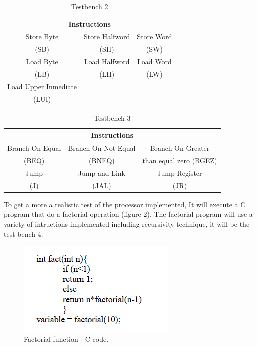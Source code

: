 \documentclass[conference]{IEEEtran}
\begin{document}
\FloatBarrier
\begin{table}[t]
	\caption{Testbench 2} %
	\begin{center}
		\begin{tabular}{|c|c|c|}
			\hline
			\multicolumn{3}{|c|}{\textbf{Instructions}} \\
			\hline
			Store Byte&Store Halfword&Store Word\\
			(SB)&(SH)&(SW)  \\
			\hline
			Load Byte&Load Halfword&Load Word\\
			(LB)&(LH)&(LW) \\
			\hline
			Load Upper Inmediate&&\\
			(LUI)&& \\
			\hline
		\end{tabular}
		\label{tab_test2}
	\end{center}
\end{table}
\FloatBarrier

\FloatBarrier
\begin{table}[htbp]
	\caption{Testbench 3} %
	\begin{center}
		\begin{tabular}{|c|c|c|}
			\hline
			\multicolumn{3}{|c|}{\textbf{Instructions}} \\
			\hline
			Branch On Equal&Branch On Not Equal&Branch On Greater \\
			(BEQ)&(BNEQ)&than equal zero (BGEZ)  \\
			\hline
			Jump&Jump and Link&Jump Register\\
			(J)&(JAL)&(JR) \\
			\hline
		\end{tabular}
		\label{tab_test3}
	\end{center}
\end{table}
\FloatBarrier

To get a more a realistic test of the processor implemented, It will execute a C program that do a factorial operation (figure 2). The factorial program will use a variety of  intructions implemented including recursivity technique, it will be the test bench 4.
\begin{figure}[h]
\begin{center}
\includegraphics[scale=0.8]{factorial_c.png}
\caption{Factorial function - C code.}
\label{fact_c}
\end{center}
\end{figure}
\end{document}
